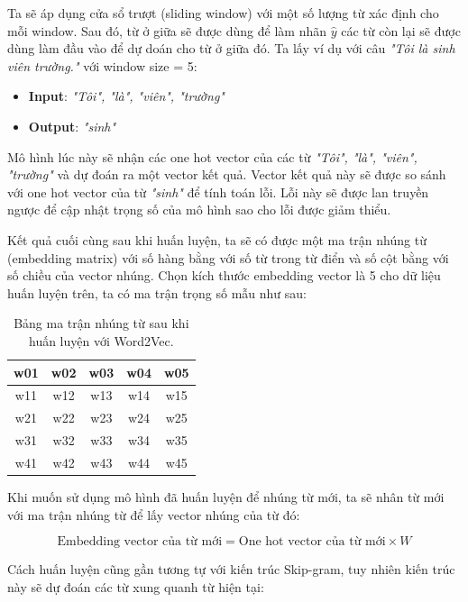 \documentclass[a4paper, 12pt, openany]{book}
\begin{document}
Ta sẽ áp dụng cửa sổ trượt (sliding window) với một số lượng từ xác định cho mỗi window. Sau đó, từ ở giữa sẽ được dùng để làm nhãn \(\hat{y}\)
các từ còn lại sẽ được dùng làm đầu vào để dự doán cho từ ở giữa đó. Ta lấy ví dụ với câu \textit{"Tôi là sinh viên trường."} với window size = 5:

\begin{itemize}
    \item \textbf{Input}: \textit{"Tôi", "là", "viên", "trường"}
    \item \textbf{Output}: \textit{"sinh"}
\end{itemize}

Mô hình lúc này sẽ nhận các one hot vector của các từ \textit{"Tôi", "là", "viên", "trường"} và dự đoán ra một vector kết quả.
Vector kết quả này sẽ được so sánh với one hot vector của từ \textit{"sinh"} để tính toán lỗi. 
Lỗi này sẽ được lan truyền ngược để cập nhật trọng số của mô hình sao cho lỗi được giảm thiểu.

Kết quả cuối cùng sau khi huấn luyện, ta sẽ có được  một ma trận nhúng từ (embedding matrix) với số hàng bằng với số từ trong từ điển và số cột bằng với số chiều của vector nhúng.
Chọn kích thước embedding vector là 5 cho dữ liệu huấn luyện trên, ta có ma trận trọng số mẫu như sau:

\begin{table}[H]
    \centering
    \begin{tabular}{|c|c|c|c|c|}
        \hline
        w01 & w02 & w03 & w04 & w05 \\ \hline
        w11 & w12 & w13 & w14 & w15 \\ \hline
        w21 & w22 & w23 & w24 & w25 \\ \hline
        w31 & w32 & w33 & w34 & w35 \\ \hline
        w41 & w42 & w43 & w44 & w45 \\ \hline
    \end{tabular}
    \caption{Bảng ma trận nhúng từ sau khi huấn luyện với Word2Vec.}
\end{table}

Khi muốn sử dụng mô hình đã huấn luyện để nhúng từ mới, ta sẽ nhân từ mới với ma trận nhúng từ để lấy vector nhúng của từ đó:

\begin{equation}
    \text{Embedding vector của từ mới} = \text{One hot vector của từ mới} \times W
\end{equation}

Cách huấn luyện cũng gần tương tự với kiến trúc Skip-gram, tuy nhiên kiến trúc này sẽ dự đoán các từ xung quanh từ hiện tại:
\end{document}
